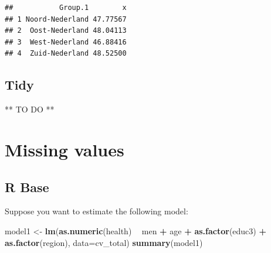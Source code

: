 \documentclass[
]{book}
\newenvironment{Shaded}{\begin{snugshade}}{\end{snugshade}}
\newcommand{\CommentTok}[1]{\textcolor[rgb]{0.56,0.35,0.01}{\textit{#1}}}
\newcommand{\ControlFlowTok}[1]{\textcolor[rgb]{0.13,0.29,0.53}{\textbf{#1}}}
\newcommand{\DataTypeTok}[1]{\textcolor[rgb]{0.13,0.29,0.53}{#1}}
\newcommand{\KeywordTok}[1]{\textcolor[rgb]{0.13,0.29,0.53}{\textbf{#1}}}
\newcommand{\NormalTok}[1]{#1}
\newcommand{\OperatorTok}[1]{\textcolor[rgb]{0.81,0.36,0.00}{\textbf{#1}}}
\newcommand{\StringTok}[1]{\textcolor[rgb]{0.31,0.60,0.02}{#1}}
\begin{document}
\begin{Shaded}
\end{Shaded}

\begin{verbatim}
##           Group.1        x
## 1 Noord-Nederland 47.77567
## 2  Oost-Nederland 48.04113
## 3  West-Nederland 46.88416
## 4  Zuid-Nederland 48.52500
\end{verbatim}

\hypertarget{tidy-4}{%
\subsection{Tidy}\label{tidy-4}}

** TO DO **

\hypertarget{missing-values}{%
\section{Missing values}\label{missing-values}}

\hypertarget{r-base-5}{%
\subsection{R Base}\label{r-base-5}}

Suppose you want to estimate the following model:

\begin{Shaded}
\begin{Highlighting}[numbers=left,,]
\NormalTok{model1 <-}\StringTok{ }\KeywordTok{lm}\NormalTok{(}\KeywordTok{as.numeric}\NormalTok{(health) }\OperatorTok{~}\StringTok{ }\NormalTok{men }\OperatorTok{+}\StringTok{ }\NormalTok{age }\OperatorTok{+}\StringTok{  }\KeywordTok{as.factor}\NormalTok{(educ3) }\OperatorTok{+}\StringTok{ }\KeywordTok{as.factor}\NormalTok{(region), }\DataTypeTok{data=}\NormalTok{cv_total)}
\KeywordTok{summary}\NormalTok{(model1)}
\end{Highlighting}
\end{Shaded}
\end{document}
